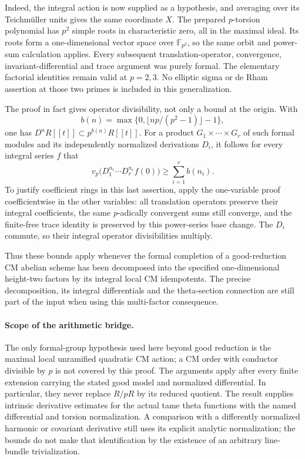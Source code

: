 \documentclass[11pt]{article}
\theoremstyle{definition}\newtheorem{definition}[theorem]{Definition}\newtheorem{remark}[theorem]{Remark}
\begin{document}
Indeed, the integral action is now supplied as a hypothesis,
and averaging over its Teichm\"uller units gives the same
coordinate $X$.  The prepared $p$-torsion polynomial has
$p^2$ simple roots in characteristic zero, all in the maximal
ideal.  Its roots form a one-dimensional vector space over
$\mathbb F_{p^2}$, so the same orbit and power-sum calculation
applies.  Every subsequent translation-operator, convergence,
invariant-differential and trace argument was purely formal.
The elementary factorial identities remain valid at $p=2,3$.
No elliptic sigma or de Rham assertion at those two primes
is included in this generalization.

The proof in fact gives operator divisibility, not only a
bound at the origin.  With
\[
 b(n)=\max\{0,\lfloor np/(p^2-1)\rfloor-1\},
\]
one has $D^nR[[t]]\subset p^{b(n)}R[[t]]$.
For a product $G_1\times\cdots\times G_r$ of such formal
modules and its independently normalized derivations $D_i$,
it follows for every integral series $f$ that
\[
 v_p\bigl(D_1^{n_1}\cdots D_r^{n_r}f(0)\bigr)
       \geq\sum_{i=1}^r b(n_i).
\]
To justify coefficient rings in this last assertion, apply the
one-variable proof coefficientwise in the other variables:
all translation operators preserve their integral coefficients,
the same $p$-adically convergent sums still converge, and the
finite-free trace identity is preserved by this power-series
base change.  The $D_i$ commute, so their integral operator
divisibilities multiply.

Thus these bounds apply whenever the formal completion of a
good-reduction CM abelian scheme has been decomposed into the
specified one-dimensional height-two factors by its integral
local CM idempotents.  The precise decomposition, its integral
differentials and the theta-section connection are still part
of the input when using this multi-factor consequence.

\paragraph{Scope of the arithmetic bridge.}
The only formal-group hypothesis used here beyond good reduction
is the maximal local unramified quadratic CM action; a CM order
with conductor divisible by $p$ is not covered by this proof.
The arguments apply after every finite extension carrying the
stated good model and normalized differential.  In particular,
they never replace $R/pR$ by its reduced quotient.
The result supplies intrinsic derivative estimates for the actual
tame theta functions with the named differential and torsion
normalization.  A comparison with a differently normalized
harmonic or covariant derivative still uses its explicit analytic
normalization; the bounds do not make that identification by
the existence of an arbitrary line-bundle trivialization.
\end{document}
